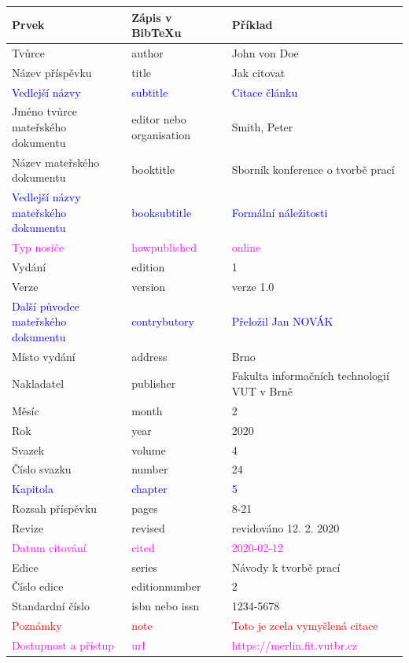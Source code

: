 \begin{tabularx}{\linewidth}{X X X}
    Prvek & Zápis v BibTeXu & Příklad\\\hline
    Tvůrce & author & John von Doe\\
    Název příspěvku & title & Jak citovat\\
    \textcolor{blue}{Vedlejší názvy} & \textcolor{blue}{subtitle} & \textcolor{blue}{Citace článku}\\
    Jméno tvůrce mateřského dokumentu & editor nebo organisation & Smith, Peter\\
    Název mateřského dokumentu & booktitle & Sborník konference o tvorbě prací\\
    \textcolor{blue}{Vedlejší názvy mateřského dokumentu} & \textcolor{blue}{booksubtitle} & \textcolor{blue}{Formální náležitosti}\\
    \textcolor{magenta}{Typ nosiče} & \textcolor{magenta}{howpublished} & \textcolor{magenta}{online}\\
    Vydání & edition & 1\\
    Verze & version & verze 1.0\\
    \textcolor{blue}{Další původce mateřského dokumentu} & \textcolor{blue}{contrybutory} & \textcolor{blue}{Přeložil Jan NOVÁK}\\
    Místo vydání & address & Brno\\
    Nakladatel & publisher & Fakulta informačních technologií VUT v Brně\\
    Měsíc & month & 2\\
    Rok & year & 2020\\
    Svazek & volume & 4\\
    Číslo svazku & number & 24\\
    \textcolor{blue}{Kapitola} & \textcolor{blue}{chapter} & \textcolor{blue}{5}\\
    Rozsah příspěvku & pages & 8-21\\
    Revize & revised & revidováno 12. 2. 2020\\
    \textcolor{magenta}{Datum citování} & \textcolor{magenta}{cited} & \textcolor{magenta}{2020-02-12}\\
    Edice & series & Návody k tvorbě prací\\
    Číslo edice & editionnumber & 2\\
    Standardní číslo & isbn nebo issn & 1234-5678\\
    \textcolor{red}{Poznámky} & \textcolor{red}{note} & \textcolor{red}{Toto je zcela vymyšlená citace}\\
    \textcolor{magenta}{Dostupnost a přístup} & \textcolor{magenta}{url} & \textcolor{magenta}{https://merlin.fit.vutbr.cz}\\
\end{tabularx}

